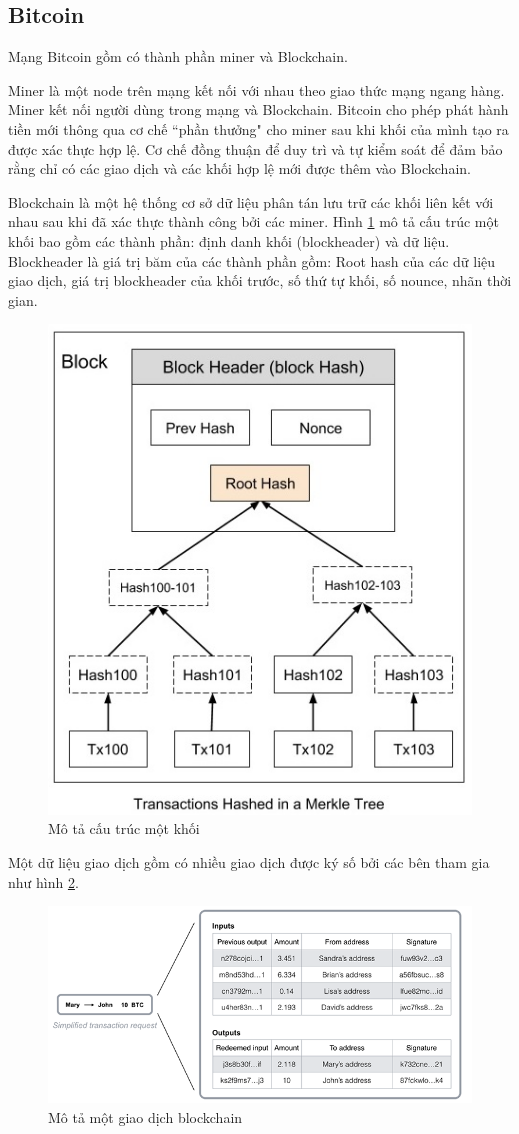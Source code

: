 \subsection{Bitcoin}
Mạng Bitcoin gồm có thành phần miner và Blockchain.

Miner là một node trên mạng kết nối với nhau theo giao thức mạng ngang hàng.
Miner kết nối người dùng trong mạng và Blockchain.
Bitcoin cho phép phát hành tiền mới thông qua cơ chế ``phần thưởng" cho miner sau khi khối của mình tạo ra được xác thực hợp lệ. Cơ chế đồng thuận để duy trì và tự kiểm soát để đảm bảo rằng chỉ có các giao dịch và các khối hợp lệ mới được thêm vào Blockchain.

Blockchain là một hệ thống cơ sở dữ liệu phân tán lưu trữ các khối liên kết với nhau sau khi đã xác thực thành công bởi các miner. Hình \ref{fig:merkle_bitcoin} mô tả cấu trúc một khối bao gồm các thành phần: định danh khối (blockheader) và dữ liệu.
Blockheader là giá trị băm của các thành phần gồm: Root hash của các dữ liệu giao dịch, giá trị blockheader của khối trước, số thứ tự khối, số nounce, nhãn thời gian.

\begin{figure}[htbp]
\centering
\includegraphics[width=.5\linewidth]{img/merkle_tree.jpg}
\caption{Mô tả cấu trúc một khối}
\label{fig:merkle_bitcoin}
\end{figure}

Một dữ liệu giao dịch gồm có nhiều giao dịch được ký số bởi các bên tham gia như hình \ref{fig:trans_bitcoin}.

\begin{figure}[htbp]
\centering
\includegraphics[width=.9\linewidth]{img/trans_bitcoin.png}
\caption{Mô tả một giao dịch blockchain}
\label{fig:trans_bitcoin}
\end{figure}

